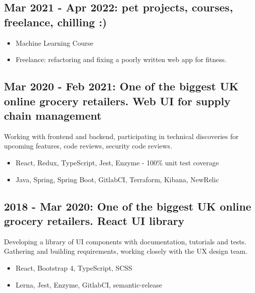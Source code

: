 \documentclass[a4paper, 14pt]{article}
\begin{document}
  \subsection{Mar 2021 - Apr 2022: pet projects, courses, freelance, chilling :)}
    \begin{itemize}
      \item Machine Learning Course \\
      \item Freelance: refactoring and fixing a poorly written web app for fitness.
    \end{itemize}
  \subsection{Mar 2020 - Feb 2021: One of the biggest UK online grocery retailers. Web UI for supply chain management}
  Working with frontend and backend, participating in technical discoveries for upcoming features, code reviews, security code reviews.
    \begin{itemize}
      \item React, Redux, TypeScript, Jest, Enzyme - 100\% unit test coverage \\
      \item Java, Spring, Spring Boot, GitlabCI, Terraform, Kibana, NewRelic
    \end{itemize}
  \subsection{2018 - Mar 2020: One of the biggest UK online grocery retailers. React UI library}
    Developing a library of UI components with documentation, tutorials and tests. \\
    Gathering and building requirements, working closely with the UX design team.
    \begin{itemize}
      \item React, Bootstrap 4, TypeScript, SCSS \\ 
      \item Lerna, Jest, Enzyme, GitlabCI, semantic-release
    \end{itemize}
\end{document}
